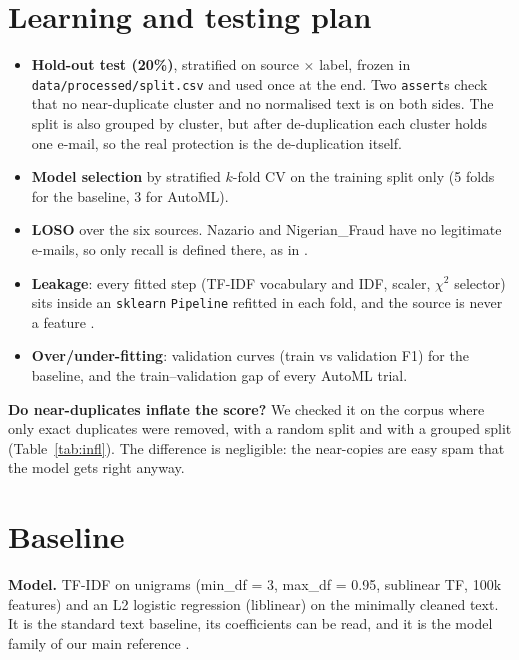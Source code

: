 \documentclass[11pt,a4paper]{article}
\newcommand{\tab}[1]{}
\begin{document}
\section{Learning and testing plan}
\begin{itemize}
\item \textbf{Hold-out test (20\%)}, stratified on source $\times$ label, frozen in \texttt{data/processed/split.csv} and used once at the end. Two \texttt{assert}s check that no near-duplicate cluster and no normalised text is on both sides. The split is also grouped by cluster, but after de-duplication each cluster holds one e-mail, so the real protection is the de-duplication itself.
\item \textbf{Model selection} by stratified $k$-fold CV on the training split only (5 folds for the baseline, 3 for AutoML).
\item \textbf{LOSO} over the six sources. Nazario and Nigerian\_Fraud have no legitimate e-mails, so only recall is defined there, as in \cite{bhuiyan2026}.
\item \textbf{Leakage}: every fitted step (TF-IDF vocabulary and IDF, scaler, $\chi^2$ selector) sits inside an \texttt{sklearn} \texttt{Pipeline} refitted in each fold, and the source is never a feature \cite{kapoor2023}.
\item \textbf{Over/under-fitting}: validation curves (train vs validation F1) for the baseline, and the train--validation gap of every AutoML trial.
\end{itemize}
\begin{table}[H]\centering\small
\caption{Frozen hold-out split.}
\tab{tab_split}
\end{table}

\textbf{Do near-duplicates inflate the score?} We checked it on the corpus where only exact duplicates were removed, with a random split and with a grouped split (Table~\ref{tab:infl}). The difference is negligible: the near-copies are easy spam that the model gets right anyway.
\begin{table}[H]\centering\small
\caption{Effect of letting near-duplicates cross the split (baseline model).}\label{tab:infl}
\tab{tab_inflation}
\end{table}

\section{Baseline}
\textbf{Model.} TF-IDF on unigrams (min\_df = 3, max\_df = 0.95, sublinear TF, 100k features) and an L2 logistic regression (liblinear) on the minimally cleaned text. It is the standard text baseline, its coefficients can be read, and it is the model family of our main reference \cite{bhuiyan2026}.
\end{document}

